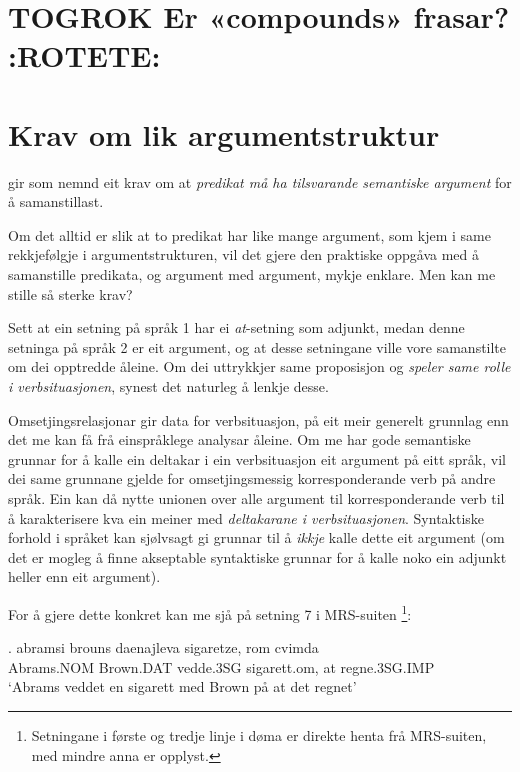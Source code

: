 \documentclass[11pt,a4paper,oneside,draft]{book}
\begin{document}
\section{\textbf{TOGROK} Er «compounds» frasar? \textbf{:ROTETE:}}
\label{sec-3.11}

 \citep[p.~1]{giegerich2006aea}


\section{Krav om lik argumentstruktur}
\label{sec-3.12}

\label{SEC:lik-argstr}

\citet{thunes2003eal} gir som nemnd eit krav om at \emph{predikat må ha tilsvarande semantiske argument} for å samanstillast.

Om det alltid er slik at to predikat har like mange argument, som kjem i
same rekkjefølgje i argumentstrukturen, vil det gjere den praktiske
oppgåva med å samanstille predikata, og argument med argument, mykje
enklare. Men kan me stille så sterke krav?

Sett at ein setning på språk 1 har ei \emph{at}-setning som adjunkt, medan
denne setninga på språk 2 er eit argument, og at desse setningane
ville vore samanstilte om dei opptredde åleine. Om dei uttrykkjer same
proposisjon og \emph{speler same rolle i verbsituasjonen},
synest det naturleg å lenkje desse.  

Omsetjingsrelasjonar gir data for verbsituasjon, på eit meir generelt
grunnlag enn det me kan få frå einspråklege analysar åleine. Om me har
gode semantiske grunnar for å kalle ein deltakar i ein verbsituasjon
eit argument på eitt språk, vil dei same grunnane gjelde for
omsetjingsmessig korresponderande verb på andre språk. Ein kan då
nytte unionen over alle argument til korresponderande verb til å
karakterisere kva ein meiner med \emph{deltakarane i verbsituasjonen}. Syntaktiske forhold i språket kan sjølvsagt gi
grunnar til å \emph{ikkje} kalle dette eit argument (om det er mogleg å
finne akseptable syntaktiske grunnar for å kalle noko ein adjunkt
heller enn eit argument).
 
For å gjere dette konkret kan me sjå på setning 7 i MRS-suiten
\citep{mrs-suite}\footnote{Setningane i første og tredje linje i døma er direkte henta frå
MRS-suiten, med mindre anna er opplyst. }:

\exg.  abramsi brouns       daenajleva sigaretze, rom cvimda \\
      Abrams.NOM Brown.DAT vedde.3SG sigarett.om, at  regne.3SG.IMP \\
     `Abrams veddet en sigarett med Brown på at det regnet' 
\end{document}
